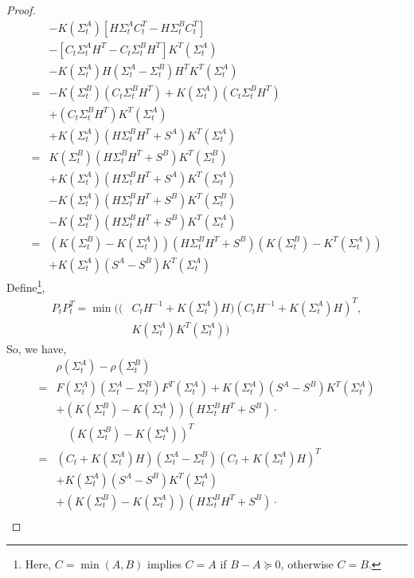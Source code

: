 \documentclass[journal]{IEEEtran}
\begin{document}
\begin{proof}
\begin{equation}
\begin{split}
&-K(\Sigma^A_{t})[H\Sigma^A_{t}C_t^T-H\Sigma^B_{t}C_t^T]\\
&-[C_t\Sigma^A_{t}H^T-C_t\Sigma^B_{t}H^T]K^T(\Sigma^A_{t})\\
&-K(\Sigma^A_{t})H(\Sigma^A_{t}-\Sigma^B_{t})H^TK^T(\Sigma^A_{t})\\
=&-K(\Sigma^B_{t})(C_t\Sigma^B_{t}H^T)+K(\Sigma^A_{t})(C_t\Sigma^B_{t}H^T)\\
&+(C_t\Sigma^B_{t}H^T)K^T(\Sigma^A_{t})\\
&+K(\Sigma^A_{t})(H\Sigma^B_{t}H^T+S^A)K^T(\Sigma^A_{t})\\
=&K(\Sigma^B_{t})(H\Sigma^B_{t}H^T+S^B)K^T(\Sigma^B_{t})\\
&+K(\Sigma^A_{t})(H\Sigma^B_{t}H^T+S^A)K^T(\Sigma^A_{t})\\
&-K(\Sigma^A_{t})(H\Sigma^B_{t}H^T+S^B)K^T(\Sigma^B_{t})\\
&-K(\Sigma^B_{t})(H\Sigma^B_{t}H^T+S^B)K^T(\Sigma^A_{t})\\
=&(K(\Sigma^B_{t})-K(\Sigma^A_{t}))(H\Sigma^B_{t}H^T+S^B)(K(\Sigma^B_{t})-K^T(\Sigma^A_{t}))\\
&+K(\Sigma^A_{t})(S^A-S^B)K^T(\Sigma^A_{t})
\end{split}
\end{equation}
Define\footnote{Here,  $C=\min(A,B)$ implies $C = A$ if $B - A \succeq 0$, otherwise $C = B$.}, 
\begin{equation}\label{maxM}
\begin{split}
P_t P^T_t=\min((&C_tH^{-1}+K(\Sigma^A_{t})H)(C_tH^{-1}+K(\Sigma^A_{t})H)^T, \\ &K(\Sigma^A_{t})K^T(\Sigma^A_{t}) )
\end{split}
\end{equation}
So, we have,
\begin{equation}
\begin{split}
&\rho(\Sigma^A_{t})-\rho(\Sigma^B_{t})\\
=&F(\Sigma^A_{t})(\Sigma^A_{t}-\Sigma^B_{t})F^T(\Sigma^A_{t})+K(\Sigma^A_{t})(S^A-S^B)K^T(\Sigma^A_{t})\\
&+(K(\Sigma^B_{t})-K(\Sigma^A_{t}))(H\Sigma^B_{t}H^T+S^B)\cdot\\
&\quad(K(\Sigma^B_{t})-K(\Sigma^A_{t}))^T\\
=&(C_t+K(\Sigma^A_{t})H)(\Sigma^A_{t}-\Sigma^B_{t})(C_t+K(\Sigma^A_{t})H)^T\\
&+K(\Sigma^A_{t})(S^A-S^B)K^T(\Sigma^A_{t})\\
&+(K(\Sigma^B_{t})-K(\Sigma^A_{t}))(H\Sigma^B_{t}H^T+S^B)\cdot\\

\end{split}
\end{equation}
\end{proof}
\end{document}
